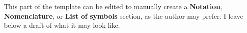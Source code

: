 %
%
%
%
%
%

\begingroup
\setlength{\LTpre}{0pt}

\setlength{\LTleft}{0pt}
\setlength{\LTright}{\fill}

\setcounter{secnumdepth}{0}

{}
\chapter*{\notationname}
\markboth{\notationname}{}
\label{notation}

This part of the template can be edited to manually create a \textbf{Notation}, \textbf{Nomenclature}, or \textbf{List of symbols} section, as the author may prefer.
I leave below a draft of what it may look like.


